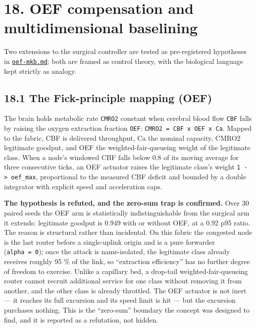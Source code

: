 \documentclass[
  american,
  11pt,
]{article}
\begin{document}
\section{18. OEF compensation and multidimensional
baselining}\label{oef-compensation-and-multidimensional-baselining}

Two extensions to the surgical controller are tested as pre-registered
hypotheses in \href{oef-mkb.md}{\texttt{oef-mkb.md}}; both are framed as
control theory, with the biological language kept strictly as analogy.

\subsection{18.1 The Fick-principle mapping
(OEF)}\label{the-fick-principle-mapping-oef}

The brain holds metabolic rate \texttt{CMRO2} constant when cerebral
blood flow \texttt{CBF} falls by raising the oxygen extraction fraction
\texttt{OEF}: \texttt{CMRO2\ =\ CBF\ x\ OEF\ x\ Ca}. Mapped to the
fabric, CBF is delivered throughput, Ca the nominal capacity, CMRO2
legitimate goodput, and OEF the weighted-fair-queueing weight of the
legitimate class. When a node's windowed CBF falls below 0.8 of its
moving average for three consecutive ticks, an OEF actuator raises the
legitimate class's weight \texttt{1\ -\textgreater{}\ oef\_max},
proportional to the measured CBF deficit and bounded by a double
integrator with explicit speed and acceleration caps.

\textbf{The hypothesis is refuted, and the zero-sum trap is confirmed.}
Over 30 paired seeds the OEF arm is statistically indistinguishable from
the surgical arm it extends: legitimate goodput is 0.949 with or without
OEF, at a 0.92 p95 ratio. The reason is structural rather than
incidental. On this fabric the congested node is the last router before
a single-uplink origin and is a pure forwarder (\texttt{alpha\ =\ 0});
once the attack is name-isolated, the legitimate class already receives
roughly 95 \% of the link, so ``extraction efficiency'' has no further
degree of freedom to exercise. Unlike a capillary bed, a drop-tail
weighted-fair-queueing router cannot recruit additional service for one
class without removing it from another, and the other class is already
throttled. The OEF actuator is not inert --- it reaches its full
excursion and its speed limit is hit --- but the excursion purchases
nothing. This is the ``zero-sum'' boundary the concept was designed to
find, and it is reported as a refutation, not hidden.
\end{document}
